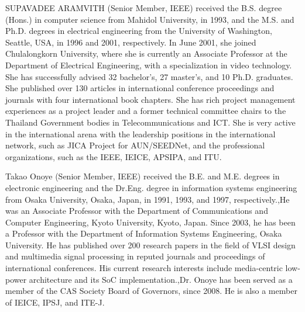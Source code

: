 \documentclass{ieeeaccess}
\begin{document}
\begin{IEEEbiography}{SUPAVADEE ARAMVITH} (Senior Member, IEEE) received the B.S. degree (Hons.) in computer science from Mahidol University, in 1993, and the M.S. and Ph.D. degrees in electrical engineering from the University of Washington, Seattle, USA, in 1996 and 2001, respectively. In June 2001, she joined Chulalongkorn University, where she is currently an Associate Professor at the Department of Electrical Engineering, with a specialization in video technology. She has successfully advised 32 bachelor’s, 27 master’s, and 10 Ph.D. graduates. She published over 130 articles in international conference proceedings and journals with four international book chapters. She has rich project management experiences as a project leader and a former technical committee chairs to the Thailand Government bodies in Telecommunications and ICT. She is very active in the international arena with the leadership positions in the international network, such as JICA Project for AUN/SEEDNet, and the professional organizations, such as the IEEE, IEICE, APSIPA, and ITU.
\end{IEEEbiography}

\begin{IEEEbiography}{Takao Onoye} (Senior Member, IEEE) received the B.E. and M.E. degrees in electronic engineering and the Dr.Eng. degree in information systems engineering from Osaka University, Osaka, Japan, in 1991, 1993, and 1997, respectively.,He was an Associate Professor with the Department of Communications and Computer Engineering, Kyoto University, Kyoto, Japan. Since 2003, he has been a Professor with the Department of Information Systems Engineering, Osaka University. He has published over 200 research papers in the field of VLSI design and multimedia signal processing in reputed journals and proceedings of international conferences. His current research interests include media-centric low-power architecture and its SoC implementation.,Dr. Onoye has been served as a member of the CAS Society Board of Governors, since 2008. He is also a member of IEICE, IPSJ, and ITE-J.


\end{IEEEbiography}




\EOD
\end{document}
